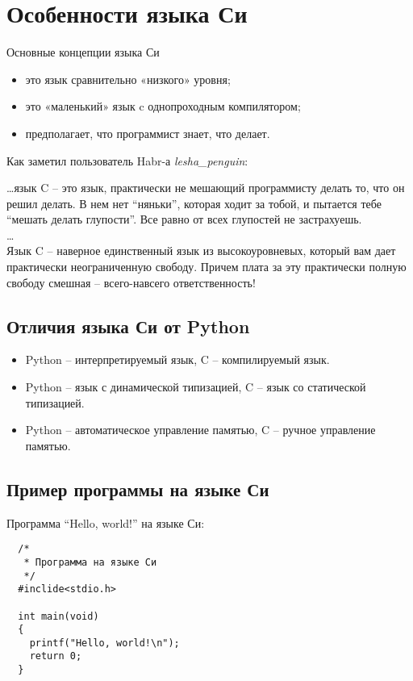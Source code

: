 \section{Особенности языка Си}

Основные концепции языка Си
\begin{itemize}
  \item это язык сравнительно «низкого» уровня;
  \item это «маленький» язык c однопроходным компилятором;
  \item предполагает, что программист знает, что делает.
\end{itemize}

Как заметил пользователь Habr-а \textit{lesha\_penguin}:

\begin{displayquote}
  \ldots язык C -- это язык, практически не мешающий программисту делать то, что он решил делать. В нем нет ``няньки'', которая ходит за тобой, и пытается тебе ``мешать делать глупости''. Все равно от всех глупостей не застрахуешь. \\
  \ldots \\
  Язык C -- наверное единственный язык из высокоуровневых, который вам дает практически неограниченную свободу. Причем плата за эту практически полную свободу смешная -- всего-навсего ответственность!
\end{displayquote}

\subsection{Отличия языка Си от Python}

\begin{itemize}
  \item Python -- интерпретируемый язык, C -- компилируемый язык.
  \item Python -- язык с динамической типизацией, C -- язык со статической типизацией.
  \item Python -- автоматическое управление памятью, C -- ручное управление памятью.
\end{itemize}

\subsection{Пример программы на языке Си}

Программа ``Hello, world!'' на языке Си:

\begin{verbatim}
  /*
   * Программа на языке Си
   */
  #inclide<stdio.h>

  int main(void)
  {
    printf("Hello, world!\n");
    return 0;
  }
\end{verbatim}

